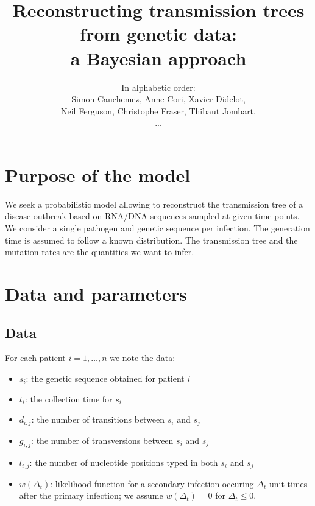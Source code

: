 \documentclass[10pt]{article}
\author{In alphabetic order: \\Simon Cauchemez, Anne Cori, Xavier Didelot, \\Neil Ferguson, Christophe Fraser, Thibaut Jombart,\\...}
\title{Reconstructing transmission trees from genetic data: \\a Bayesian approach}
\begin{document}
\maketitle

\section*{Purpose of the model}
We seek a probabilistic model allowing to reconstruct the transmission tree of a disease outbreak based on RNA/DNA sequences sampled at given time points.
We consider a single pathogen and genetic sequence per infection.
The generation time is assumed to follow a known distribution.
The transmission tree and the mutation rates are the quantities we want to infer.



\section*{Data and parameters}

\subsection*{Data}
For each patient $i=1,\ldots,n$ we note the data:
\begin{itemize}
	\item $s_i$: the genetic sequence obtained for patient $i$
	\item $t_i$: the collection time for $s_i$
 	\item $d_{i,j}$: the number of transitions between $s_i$ and $s_j$
 	\item $g_{i,j}$: the number of transversions between $s_i$ and $s_j$
 	\item $l_{i,j}$: the number of nucleotide positions typed in both $s_i$ and $s_j$
 	\item $w(\Delta_t)$: likelihood function for a secondary infection occuring $\Delta_t$ unit times after the primary infection; we assume $w(\Delta_t)=0$ for $\Delta_t \leq 0$.
\end{itemize}
\end{document}
